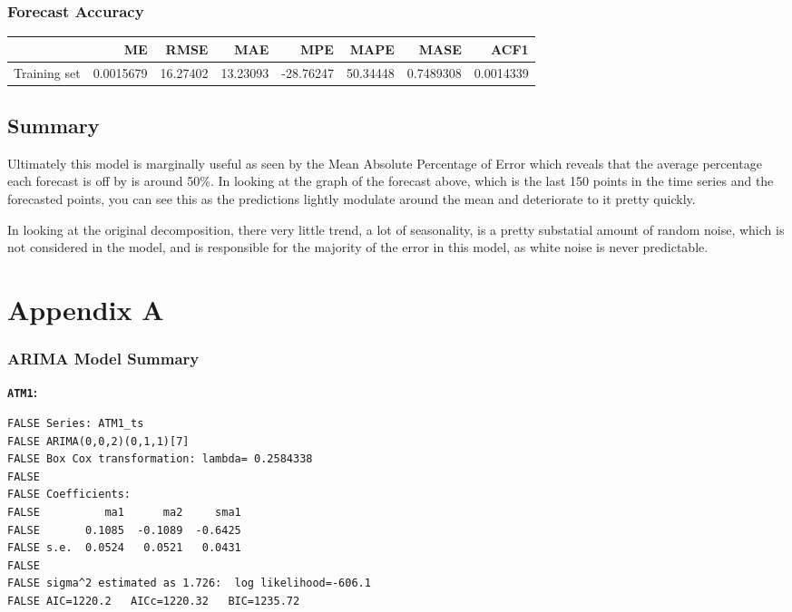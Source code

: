 \documentclass[openany]{book}
\begin{document}
\hypertarget{forecast-accuracy}{%
\subsection{Forecast Accuracy}\label{forecast-accuracy}}

\begin{tabular}{l|r|r|r|r|r|r|r}
\hline
  & ME & RMSE & MAE & MPE & MAPE & MASE & ACF1\\
\hline
Training set & 0.0015679 & 16.27402 & 13.23093 & -28.76247 & 50.34448 & 0.7489308 & 0.0014339\\
\hline
\end{tabular}

\hypertarget{summary-2}{%
\section{Summary}\label{summary-2}}

Ultimately this model is marginally useful as seen by the Mean Absolute
Percentage of Error which reveals that the average percentage each
forecast is off by is around 50\%. In looking at the graph of the
forecast above, which is the last 150 points in the time series and the
forecasted points, you can see this as the predictions lightly modulate
around the mean and deteriorate to it pretty quickly.

In looking at the original decomposition, there very little trend, a lot
of seasonality, is a pretty substatial amount of random noise, which is
not considered in the model, and is responsible for the majority of the
error in this model, as white noise is never predictable.

\hypertarget{appendix-a}{%
\chapter*{Appendix A}\label{appendix-a}}

\hypertarget{arima-a}{%
\subsection*{ARIMA Model Summary}\label{arima-a}}

\textbf{\texttt{ATM1}:}

\begin{verbatim}
FALSE Series: ATM1_ts 
FALSE ARIMA(0,0,2)(0,1,1)[7] 
FALSE Box Cox transformation: lambda= 0.2584338 
FALSE 
FALSE Coefficients:
FALSE          ma1      ma2     sma1
FALSE       0.1085  -0.1089  -0.6425
FALSE s.e.  0.0524   0.0521   0.0431
FALSE 
FALSE sigma^2 estimated as 1.726:  log likelihood=-606.1
FALSE AIC=1220.2   AICc=1220.32   BIC=1235.72
\end{verbatim}
\end{document}
